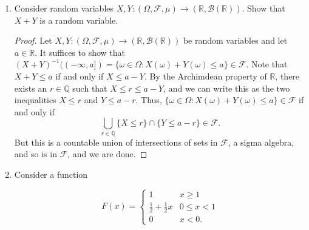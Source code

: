 \documentclass[11pt,oneside,english]{amsart}
\theoremstyle{definition}
\newcommand{\lspace}{\vspace{5mm}}
\newcommand{\MC}[1]{\mathcal{#1}}
\newcommand{\MB}[1]{\mathbb{#1}}
\newcommand{\1}{\mathbbm{1}}
\begin{document}
\rightline{\today}

\lspace




\begin{enumerate}[leftmargin=*]
\itemsep5mm



\item Consider random variables $X,Y:(\Omega,\MC{F},\mu)\to(\MB{R},\MC{B}(\MB{R}))$. Show that $X+Y$ is a random variable.

\begin{proof}
Let $X,Y:(\Omega,\MC{F},\mu)\to(\MB{R},\MC{B}(\MB{R}))$ be random variables and let $a\in \MB{R}$. It suffices to show that $(X+Y)^{-1}((-\infty,a])=\{\omega\in\Omega:X(\omega)+Y(\omega)\leq a\}\in \MC{F}$. Note that $X+Y\leq a$ if and only if $X\leq a-Y$. By the Archimdean property of $\MB{R}$, there exists an $r\in \MB{Q}$ such that $X\leq r\leq a-Y$, and we can write this as the two inequalities $X\leq r$ and $Y\leq a-r$. Thus, $\{\omega\in\Omega:X(\omega)+Y(\omega)\leq a\}\in \MC{F}$ if and only if 
\[
\bigcup_{r\in\MB{Q}}\{X\leq r\}\cap\{Y\leq a-r\}\in\MC{F}.
\]
But this is a countable union of intersections of sets in $\MC{F}$, a sigma algebra, and so is in $\MC{F}$, and we are done.
\end{proof}

\pagebreak


\item Consider a function

\begin{minipage}{0.5\textwidth}
\[
F(x)=\begin{cases}1 & x\geq 1\\ \frac{1}{2}+\frac{1}{2}x & 0\leq x<1 \\ 0 & x<0.\end{cases}
\]
\end{minipage}%
\begin{minipage}{0.5\textwidth}



\end{minipage}
\end{enumerate}
\end{document}
